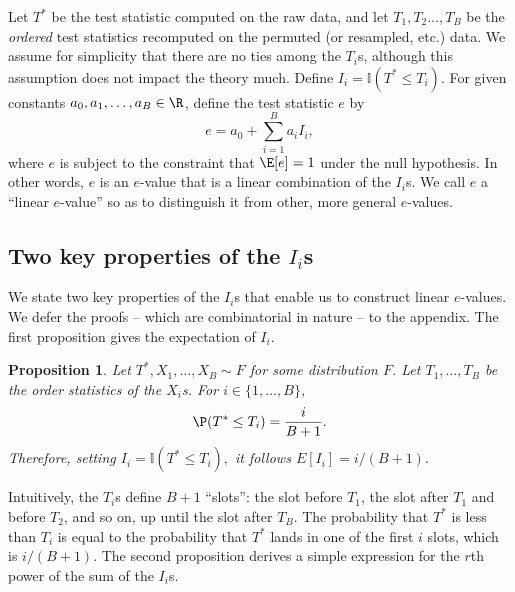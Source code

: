 \documentclass[12pt]{article}
\newtheorem{proposition}{Proposition}
\begin{document}
Let $T^*$ be the test statistic computed on the raw data, and let $T_1, T_2 \dots, T_B$ be the \textit{ordered} test statistics recomputed on the permuted (or resampled, etc.) data. We assume for simplicity that there are no ties among the $T_i$s, although this assumption does not impact the theory much. Define $I_i = \mathbb{I}(T^* \leq T_i).$ For given constants $a_0, a_1, \dots, a_B \in \R$, define the test statistic $e$ by 
$$e = a_0 + \sum_{i=1}^B a_i I_i,$$ where $e$ is subject to the constraint that $\E[e] = 1$ under the null hypothesis. In other words, $e$ is an $e$-value that is a linear combination of the $I_i$s. We call $e$ a ``linear $e$-value'' so as to distinguish it from other, more general $e$-values.

\subsection*{Two key properties of the $I_i$s}

We state two key properties of the $I_i$s that enable us to construct linear $e$-values. We defer the proofs -- which are combinatorial in nature -- to the appendix. The first proposition gives the expectation of $I_i$.

\begin{proposition}
Let $T^*, X_1, \dots, X_B \sim F$ for some distribution $F$. Let $T_1, \dots, T_B$ be the order statistics of the $X_i$s. For $i \in \{1, \dots, B\}$, $$\P(T^* \leq T_i) = \frac{i}{B+1}.$$ Therefore, setting $I_i = \mathbb{I}(T^* \leq T_i),$ it follows $E[I_i] = i/(B+1).$
\end{proposition}
Intuitively, the $T_i$s define $B+1$ ``slots'': the slot before $T_1$, the slot after $T_1$ and before $T_2$, and so on, up until the slot after $T_B$. The probability that $T^*$ is less than $T_i$ is equal to the probability that $T^*$ lands in one of the first $i$ slots, which is $i/(B+1)$. The second proposition derives a simple expression for the $r$th power of the sum of the $I_i$s.
\end{document}

